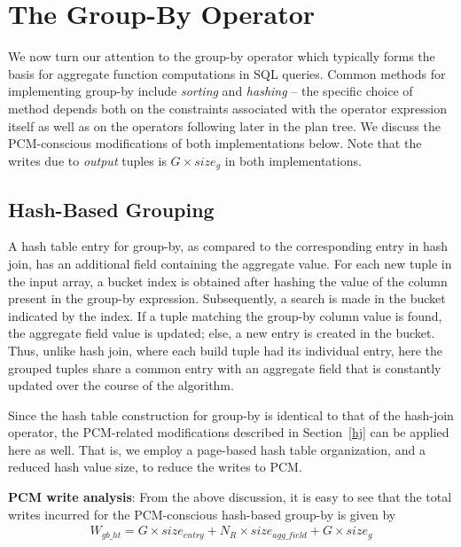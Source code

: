 \section{The Group-By Operator}%
\label{gby}
We now turn our attention to the group-by operator which typically
forms the basis for aggregate function computations in SQL queries.
Common methods for implementing group-by include \textit{sorting} and
\textit{hashing} -- the specific choice of method depends both on the
constraints associated with the operator expression itself as well as
on the operators following later in the plan tree. We discuss the
PCM-conscious modifications of both implementations below. Note that
the writes due to \emph{output} tuples is $G \times size_g$ in
both implementations.

\subsection{Hash-Based Grouping}

A hash table entry for group-by, as compared to the corresponding
entry in hash join, has an additional field containing the aggregate
value. For each new tuple in the input array, a bucket index is
obtained after hashing the value of the column present in the group-by
expression. Subsequently, a search is made in the bucket indicated by
the index. If a tuple matching the group-by column value is found, the
aggregate field value is updated; else, a new entry is created in the
bucket. Thus, unlike hash join, where each build tuple had its individual
entry, here the grouped tuples share a common entry with an aggregate
field that is constantly updated over the course of the algorithm.

Since the hash table construction for group-by is identical to that
of the hash-join operator, the PCM-related modifications described
in Section~\ref{hj} can be applied here as well. That is, we employ
a page-based hash table organization, and a reduced hash value size,
to reduce the writes to PCM.

\textbf{PCM write analysis}: From the above discussion, it is easy to see
that the total writes incurred for the PCM-conscious hash-based group-by is given by
\begin{equation}
\label{eq:gb_ht}
\begin{split}
W_{gb\_ht} = G \times size_{entry} + 
N_R \times size_{agg\_field} + G \times size_g
\end{split}
\end{equation}

